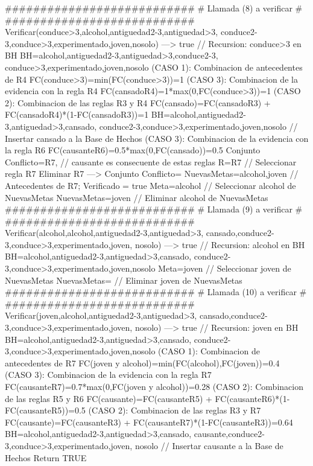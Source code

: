 \begin{listing}[language=Pascal]
  ###########################
  # Llamada (8) a verificar #
  ###########################
  	Verificar(conduce>3,{alcohol,antiguedad2-3,antiguedad>3,
	conduce2-3,conduce>3,experimentado,joven,nosolo}) ---> true // Recursion: conduce>3 en BH
	BH={alcohol,antiguedad2-3,antiguedad>3,conduce2-3,
	conduce>3,experimentado,joven,nosolo}
	(CASO 1): Combinacion de antecedentes de R4
	 FC(conduce>3)=min(FC(conduce>3))=1
	(CASO 3): Combinacion de la evidencia con la regla R4
	 FC(cansado{R4})=1*max(0,FC(conduce>3))=1
	(CASO 2): Combinacion de las reglas R3 y R4
	 FC(cansado)=FC(cansado{R3}) + FC(cansado{R4})*(1-FC(cansado{R3}))=1
	BH={alcohol,antiguedad2-3,antiguedad>3,cansado,
	conduce2-3,conduce>3,experimentado,joven,nosolo} // Insertar cansado a la Base de Hechos
	(CASO 3): Combinacion de la evidencia con la regla R6
	 FC(causante{R6})=0.5*max(0,FC(cansado))=0.5
	Conjunto Conflicto={R7,} // causante es consecuente de estas reglas
	R={R7} // Seleccionar regla R7
	Eliminar R7 ---> Conjunto Conflicto={}
	NuevasMetas={alcohol,joven} // Antecedentes de R7; Verificado = true
	Meta=alcohol // Seleccionar alcohol de NuevasMetas
	NuevasMetas={joven} // Eliminar alcohol de NuevasMetas
  ###########################
  # Llamada (9) a verificar #
  ###########################
	Verificar(alcohol,{alcohol,antiguedad2-3,antiguedad>3,
	cansado,conduce2-3,conduce>3,experimentado,joven,
	nosolo}) ---> true // Recursion: alcohol en BH
	BH={alcohol,antiguedad2-3,antiguedad>3,cansado,
	conduce2-3,conduce>3,experimentado,joven,nosolo}
	Meta=joven // Seleccionar joven de NuevasMetas
	NuevasMetas={} // Eliminar joven de NuevasMetas
  ###########################
  # Llamada (10) a verificar #
  ###########################
	Verificar(joven,{alcohol,antiguedad2-3,antiguedad>3,
	cansado,conduce2-3,conduce>3,experimentado,joven,
	nosolo}) ---> true // Recursion: joven en BH
	BH={alcohol,antiguedad2-3,antiguedad>3,cansado,
	conduce2-3,conduce>3,experimentado,joven,nosolo}
	(CASO 1): Combinacion de antecedentes de R7
	 FC(joven y alcohol)=min(FC(alcohol),FC(joven))=0.4
	(CASO 3): Combinacion de la evidencia con la regla R7
	 FC(causante{R7})=0.7*max(0,FC(joven y alcohol))=0.28
	(CASO 2): Combinacion de las reglas R5 y R6
	 FC(causante)=FC(causante{R5}) + FC(causante{R6})*(1-FC(causante{R5}))=0.5
	(CASO 2): Combinacion de las reglas R3 y R7
	 FC(causante)=FC(causante{R3}) + FC(causante{R7})*(1-FC(causante{R3}))=0.64
	BH={alcohol,antiguedad2-3,antiguedad>3,cansado,
	causante,conduce2-3,conduce>3,experimentado,joven,
	nosolo} // Insertar causante a la Base de Hechos
Return TRUE
\end{listing}

